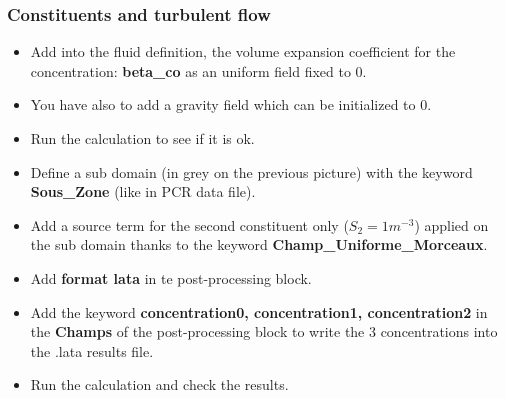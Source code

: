 \documentclass[10pt]{beamer}
\begin{document}
\begin{frame}
\frametitle{Constituents and turbulent flow}
\begin{block}{}

\begin{itemize}
\item Add into the fluid definition, the volume expansion coefficient for the concentration: \textbf{beta\_co} as an uniform field fixed to 0.

\item You have also to add a gravity field which can be initialized to 0.

\item Run the calculation to see if it is ok.

\item Define a sub domain (in grey on the previous picture) with the keyword \textbf{Sous\_Zone} (like in PCR data file).

\item Add a source term for the second constituent only ($S_2=1m^{-3}$) applied on the sub domain thanks to the keyword \textbf{Champ\_Uniforme\_Morceaux}.

\item Add \textbf{format lata} in te post-processing block.

\item Add the keyword \textbf{concentration0, concentration1, concentration2} in the \textbf{Champs} of the post-processing block to write the 3 concentrations into the .lata results file.

\item Run the calculation and check the results.
\end{itemize}

\end{block}
\end{frame}
\end{document}
